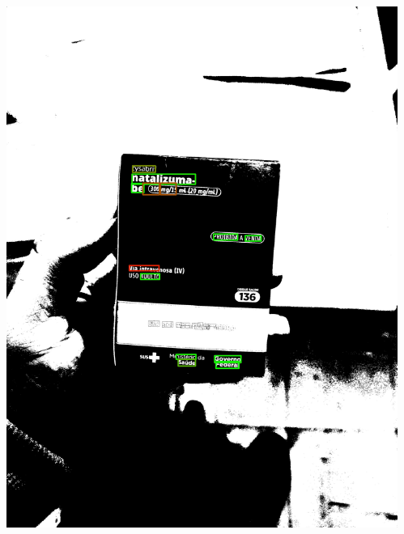 \begin{frame}
\begin{columns}
\begin{column}{0.24\textwidth}
			\includegraphics[height=0.35\textheight]{../pictures/tysabri_r_thresh_recomposed_cmyk_boxes.jpg}
		\end{column}
		\begin{column}{0.24\textwidth}\centering

\end{column}
\end{columns}
\end{frame}
